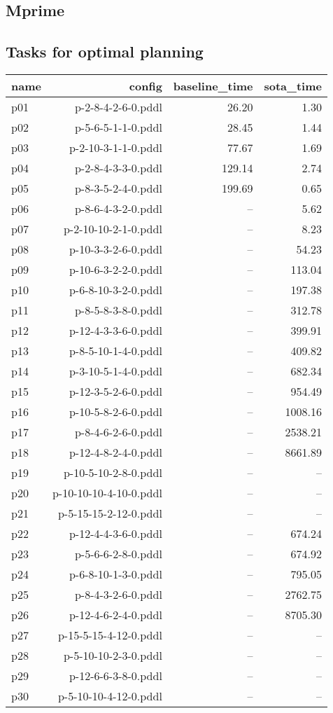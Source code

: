 \documentclass{article}
\begin{document}
                \newpage \subsection{Mprime}
                    \subsection*{Tasks for optimal planning}
                    
                            \begin{center}
                            \scriptsize
                            \begin{tabular}{@{}l|r|r|r@{}}
                            name & config & baseline\_time & sota\_time\\\midrule
                              p01& p-2-8-4-2-6-0.pddl&26.20&1.30\\
  p02& p-5-6-5-1-1-0.pddl&28.45&1.44\\
  p03& p-2-10-3-1-1-0.pddl&77.67&1.69\\
  p04& p-2-8-4-3-3-0.pddl&129.14&2.74\\
  p05& p-8-3-5-2-4-0.pddl&199.69&0.65\\
  p06& p-8-6-4-3-2-0.pddl&--&5.62\\
  p07& p-2-10-10-2-1-0.pddl&--&8.23\\
  p08& p-10-3-3-2-6-0.pddl&--&54.23\\
  p09& p-10-6-3-2-2-0.pddl&--&113.04\\
  p10& p-6-8-10-3-2-0.pddl&--&197.38\\
  p11& p-8-5-8-3-8-0.pddl&--&312.78\\
  p12& p-12-4-3-3-6-0.pddl&--&399.91\\
  p13& p-8-5-10-1-4-0.pddl&--&409.82\\
  p14& p-3-10-5-1-4-0.pddl&--&682.34\\
  p15& p-12-3-5-2-6-0.pddl&--&954.49\\
  p16& p-10-5-8-2-6-0.pddl&--&1008.16\\
  p17& p-8-4-6-2-6-0.pddl&--&2538.21\\
  p18& p-12-4-8-2-4-0.pddl&--&8661.89\\
  p19& p-10-5-10-2-8-0.pddl&--&--\\
  p20& p-10-10-10-4-10-0.pddl&--&--\\
  p21& p-5-15-15-2-12-0.pddl&--&--\\
  p22& p-12-4-4-3-6-0.pddl&--&674.24\\
  p23& p-5-6-6-2-8-0.pddl&--&674.92\\
  p24& p-6-8-10-1-3-0.pddl&--&795.05\\
  p25& p-8-4-3-2-6-0.pddl&--&2762.75\\
  p26& p-12-4-6-2-4-0.pddl&--&8705.30\\
  p27& p-15-5-15-4-12-0.pddl&--&--\\
  p28& p-5-10-10-2-3-0.pddl&--&--\\
  p29& p-12-6-6-3-8-0.pddl&--&--\\
  p30& p-5-10-10-4-12-0.pddl&--&--
                            \end{tabular}
                            \end{center}
                    
\end{document}
